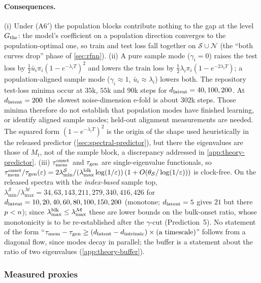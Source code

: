 \paragraph{Consequences.}
(i) Under (A6$'$) the population blocks contribute nothing to the gap at the level $G_{\rm thr}$: the model's coefficient on a population direction converges to the population-optimal one, so train and test loss fall together on $\mathcal S\cup\mathcal N$ (the ``both curves drop'' phase of \cref{sec:rfnn}). (ii) A pure sample mode ($\gamma_i=0$) raises the test loss by $\tfrac12\bar u_i\pi_i(1-e^{-\lambda_iT})^2$ and lowers the train loss by $\tfrac12\lambda_i\pi_i(1-e^{-2\lambda_iT})$; a population-aligned sample mode ($\gamma_i\approx1$, $\bar u_i\approx\lambda_i$) lowers both. The repository test-loss minima occur at $35$k, $55$k and $90$k steps for $d_{\mathrm{latent}}=40,100,200$. At $d_{\mathrm{latent}}=200$ the slowest noise-dimension e-fold is about $302$k steps. Those minima therefore do not establish that population modes have finished learning, or identify aligned sample modes; held-out alignment measurements are needed. The squared form $(1-e^{-\lambda_iT})^2$ is the origin of the shape used heuristically in the released predictor (\cref{sec:spectral-predictor}), but there the eigenvalues are those of $M_t$, not of the sample block, a discrepancy addressed in \cref{app:theory-predictor}. (iii) $\tau_{\mathrm{mem}}^{\rm onset}$ and $\tau_{\mathrm{gen}}$ are single-eigenvalue functionals, so $\tau_{\mathrm{mem}}^{\rm onset}/\tau_{\mathrm{gen}}(\varepsilon)=2\lambda^{\mathcal S}_{\min}/(\lambda^{\rm blk}_{\max}\log(1/\varepsilon))\,(1+O(\theta_{\mathcal S}/\log(1/\varepsilon)))$ is clock-free. On the released spectra with the \emph{index-based} sample top, $\lambda^{\mathcal S}_{\min}/\lambda^{\mathcal M}_{\max}=34,63,143,211,279,340,416,426$ for $d_{\mathrm{latent}}=10,20,40,60,80,100,150,200$ (monotone; $d_{\mathrm{latent}}=5$ gives $21$ but there $p<n$); since $\lambda^{\rm blk}_{\max}\le\lambda^{\mathcal M}_{\max}$ these are lower bounds on the bulk-onset ratio, whose monotonicity is to be re-established after the $\gamma$-cut (Prediction~5). No statement of the form ``$\tau_{\mathrm{mem}}-\tau_{\mathrm{gen}}\ge(d_{\mathrm{latent}}-d_{\mathrm{intrinsic}})\times(\text{a timescale})$'' follows from a diagonal flow, since modes decay in parallel; the buffer is a statement about the ratio of two eigenvalues (\cref{app:theory-buffer}).

\subsubsection{Measured proxies}

